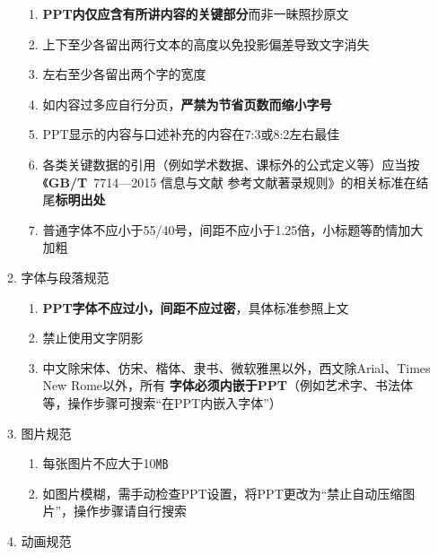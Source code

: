 \begin{enumerate}
\begin{enumerate}
                    \begin{enumerate}
                        \item \textbf{PPT内仅应含有所讲内容的关键部分}而非一昧照抄原文
                        \item 上下至少各留出两行文本的高度以免投影偏差导致文字消失
                        \item 左右至少各留出两个字的宽度
                        \item 如内容过多应自行分页，\textbf{严禁为节省页数而缩小字号}
                        \item PPT显示的内容与口述补充的内容在7:3或8:2左右最佳
                        \item 各类关键数据的引用（例如学术数据、课标外的公式定义等）应当按\\《\textbf{GB/T}\ 7714—2015 信息与文献 参考文献著录规则》的相关标准在结尾\textbf{标明出处}
                        \item 普通字体不应小于55/40号，间距不应小于1.25倍，小标题等酌情加大加粗
                    \end{enumerate}
              \item 字体与段落规范
                    \begin{enumerate}
                        \item \textbf{PPT字体不应过小，间距不应过密}，具体标准参照上文
                        \item 禁止使用文字阴影
                        \item 中文除宋体、仿宋、楷体、隶书、微软雅黑以外，西文除Arial、Times New Rome以外，所有 \textbf{字体必须内嵌于PPT}（例如艺术字、书法体等，操作步骤可搜索“在PPT内嵌入字体”）
                    \end{enumerate}
              \item 图片规范
                    \begin{enumerate}
                        \item 每张图片不应大于10㎆\footnotemark
                        \item 如图片模糊，需手动检查PPT设置，将PPT更改为“禁止自动压缩图片”，操作步骤请自行搜索
                    \end{enumerate}
              \item 动画规范\\

\end{enumerate}
\end{enumerate}
